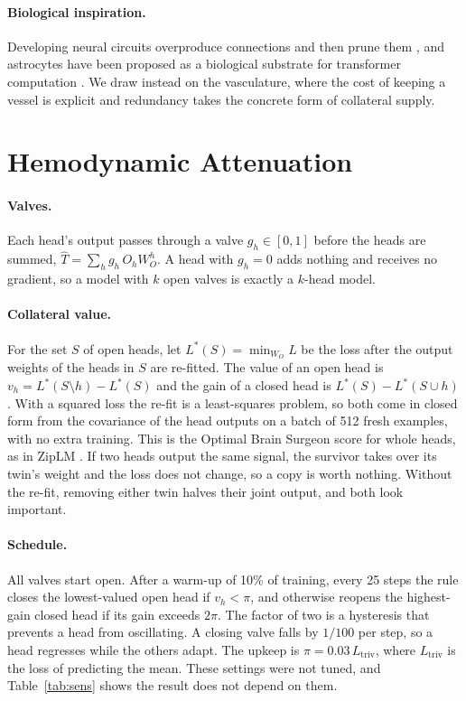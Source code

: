 \documentclass[letterpaper]{article} %
\newcommand{\Ltriv}{L_{\mathrm{triv}}}
\begin{document}
\paragraph{Biological inspiration.} Developing neural circuits overproduce connections and then prune them \citep{navlakha2015pruning}, and astrocytes have been proposed as a biological substrate for transformer computation \citep{kozachkov2023}. We draw instead on the vasculature, where the cost of keeping a vessel is explicit \citep{murray1926} and redundancy takes the concrete form of collateral supply.

\section{Hemodynamic Attenuation}

\paragraph{Valves.} Each head's output passes through a valve $g_h\in[0,1]$ before the heads are summed, $\hat{T}=\sum_h g_h\, O_h W_O^h$. A head with $g_h=0$ adds nothing and receives no gradient, so a model with $k$ open valves is exactly a $k$-head model.

\paragraph{Collateral value.} For the set $S$ of open heads, let $L^\ast(S)=\min_{W_O} L$ be the loss after the output weights of the heads in $S$ are re-fitted. The value of an open head is $v_h=L^\ast(S\setminus h)-L^\ast(S)$ and the gain of a closed head is $L^\ast(S)-L^\ast(S\cup h)$. With a squared loss the re-fit is a least-squares problem, so both come in closed form from the covariance of the head outputs on a batch of 512 fresh examples, with no extra training. This is the Optimal Brain Surgeon score \citep{obs} for whole heads, as in ZipLM \citep{ziplm}. If two heads output the same signal, the survivor takes over its twin's weight and the loss does not change, so a copy is worth nothing. Without the re-fit, removing either twin halves their joint output, and both look important.

\paragraph{Schedule.} All valves start open. After a warm-up of 10\% of training, every 25 steps the rule closes the lowest-valued open head if $v_h<\pi$, and otherwise reopens the highest-gain closed head if its gain exceeds $2\pi$. The factor of two is a hysteresis that prevents a head from oscillating. A closing valve falls by $1/100$ per step, so a head regresses while the others adapt. The upkeep is $\pi=0.03\,\Ltriv$, where $\Ltriv$ is the loss of predicting the mean. These settings were not tuned, and Table~\ref{tab:sens} shows the result does not depend on them.
\end{document}
